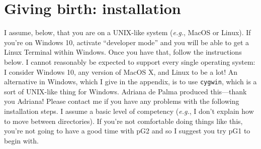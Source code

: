 \documentclass[12pt]{article}
\begin{document}
\section*{Giving birth: installation}
I assume, below, that you are on a UNIX-like system (\emph{e.g.},
MacOS or Linux). If you're on Windows 10, activate ``developer mode''
and you will be able to get a Linux Terminal within Windows. Once you
have that, follow the instructions below. I cannot reasonably be
expected to support every single operating system: I consider Windows
10, any version of MacOS X, and Linux to be a lot!  An alternative in
Windows, which I give in the appendix, is to use \texttt{cygwin},
which is a sort of UNIX-like thing for Windows. Adriana de Palma
produced this---thank you Adriana! Please contact me if you have any
problems with the following installation steps. I assume a basic level
of competency (\emph{e.g.}, I don't explain how to move between
directories). If you're not comfortable doing things like this, you're
not going to have a good time with pG2 and so I suggest you try pG1 to
begin with.
\end{document}
